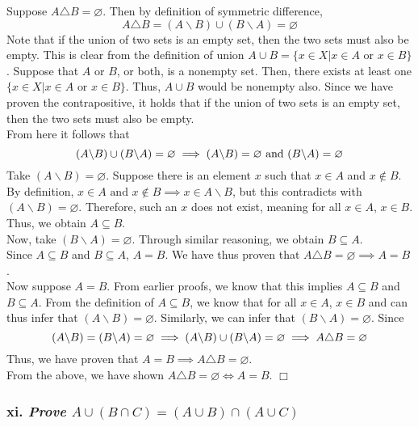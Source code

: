 \documentclass[
]{article}
\begin{document}
Suppose \(A \triangle B = \varnothing\). Then by definition of symmetric
difference,\\
\[A \triangle B = (A \backslash B) \cup (B \backslash A) = \varnothing\]
Note that if the union of two sets is an empty set, then the two sets
must also be empty. This is clear from the definition of union
\(A \cup B = \{x \in X | x \in A \text{ or } x \in B \}\). Suppose that
\(A\) or \(B\), or both, is a nonempty set. Then, there exists at least
one \(\{x \in X | x \in A \text{ or } x \in B \}\). Thus, \(A \cup B\)
would be nonempty also. Since we have proven the contrapositive, it
holds that if the union of two sets is an empty set, then the two sets
must also be empty.\\
From here it follows that
\[(A \backslash B) \cup (B \backslash A) = \varnothing \\ \implies (A \backslash B) = \varnothing \text{ and }(B \backslash A ) = \varnothing\]
Take \((A \backslash B) = \varnothing\). Suppose there is an element
\(x\) such that \(x \in A\) and \(x \notin B\). By definition,
\(x \in A \text{ and }x \notin B \implies x \in A \backslash B\), but
this contradicts with \((A \backslash B) = \varnothing\). Therefore,
such an \(x\) does not exist, meaning for all \(x \in A\), \(x \in B\).
Thus, we obtain \(A \subseteq B\).\\
Now, take \((B \backslash A) = \varnothing\). Through similar reasoning,
we obtain \(B \subseteq A\).\\
Since \(A \subseteq B\) and \(B \subseteq A\), \(A = B\). We have thus
proven that \(A \triangle B = \varnothing \implies A = B\).\\
Now suppose \(A = B\). From earlier proofs, we know that this implies
\(A \subseteq B\) and \(B \subseteq A\). From the definition of
\(A \subseteq B\), we know that for all \(x \in A\), \(x \in B\) and can
thus infer that \((A \backslash B) = \varnothing\). Similarly, we can
infer that \((B \backslash A) = \varnothing\). Since
\[(A \backslash B) = (B \backslash A) = \varnothing \\ \implies(A \backslash B) \cup (B \backslash A) = \varnothing \\ \implies A \triangle B = \varnothing\]
Thus, we have proven that
\(A = B\implies A \triangle B = \varnothing\).\\
From the above, we have shown
\(A \triangle B = \varnothing \iff A = B\). \hfill \(\Box\)

\hypertarget{xi.-prove-a-cup-b-cap-c-a-cup-b-cap-a-cup-c}{%
\subsubsection{\texorpdfstring{xi. \emph{Prove
\(A \cup (B \cap C) = (A \cup B) \cap (A \cup C)\)}}{xi. Prove A \textbackslash cup (B \textbackslash cap C) = (A \textbackslash cup B) \textbackslash cap (A \textbackslash cup C)}}\label{xi.-prove-a-cup-b-cap-c-a-cup-b-cap-a-cup-c}}
\end{document}
